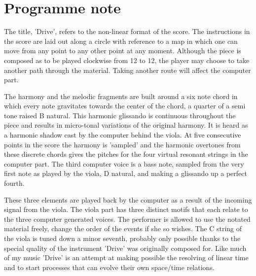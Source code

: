 \section{Programme note}
\label{sec:drive-programme-note}


The title, 'Drive', refers to the non-linear format of the score. The instructions in the score are laid out along a circle with reference to a map in which one can move from any point to any other point at any moment. Although the piece is composed as to be played clockwise from 12 to 12, the player may choose to take another path through the material. Taking another route will affect the computer part.

The harmony and the melodic fragments are built around a six note chord in which every note gravitates towards the center of the chord, a quarter of a semi tone raised B natural. This harmonic glissando is continuous throughout the piece and results in micro-tonal variations of the original harmony. It is heard as a harmonic shadow cast by the computer behind the viola. At five consecutive points in the score the harmony is 'sampled' and the harmonic overtones from these discrete chords gives the pitches for the four virtual resonant strings in the computer part. The third computer voice is a bass note, sampled from the very first note as played by the viola, D natural, and making a glissando up a perfect fourth.

These three elements are played back by the computer as a result of the incoming signal from the viola. The viola part has three distinct motifs that each relate to the three computer generated voices. The performer is allowed to use the notated material freely, change the order of the events if she so wishes. The C string of the viola is tuned down a minor seventh, probably only possible thanks to the special quality of the instrument 'Drive' was originally composed for. Like much of my music 'Drive' is an attempt at making possible the resolving of linear time and to start processes that can evolve their own space/time relations. 
